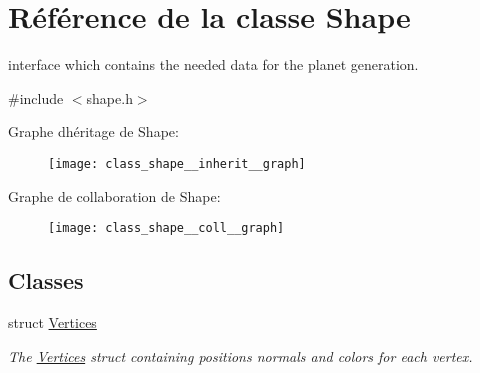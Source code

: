 \hypertarget{class_shape}{}\section{Référence de la classe Shape}
\label{class_shape}


interface which contains the needed data for the planet generation.  




{\ttfamily \#include $<$shape.\+h$>$}



Graphe d\textquotesingle{}héritage de Shape\+:
\nopagebreak
\begin{figure}[H]
\begin{center}
\leavevmode
\texttt{[image: class\_shape\_\_inherit\_\_graph]}
\end{center}
\end{figure}


Graphe de collaboration de Shape\+:\nopagebreak
\begin{figure}[H]
\begin{center}
\leavevmode
\texttt{[image: class\_shape\_\_coll\_\_graph]}
\end{center}
\end{figure}
\subsection*{Classes}
\begin{DoxyCompactItemize}
\item 
struct \hyperlink{struct_shape_1_1_vertices}{Vertices}
\begin{DoxyCompactList}\small\item\em The \hyperlink{struct_shape_1_1_vertices}{Vertices} struct containing positions normals and colors for each vertex. \end{DoxyCompactList}\end{DoxyCompactItemize}
